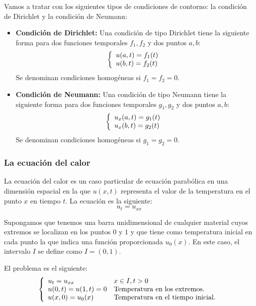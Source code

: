 Vamos a tratar con los siguientes tipos de condiciones de contorno: la condición de Dirichlet y la condición de Neumann:
\begin{itemize}
	\item \textbf{Condición de Dirichlet:}	
	Una condición de tipo Dirichlet tiene la siguiente forma para dos funciones temporales $f_1, f_2$ y dos puntos $a,b$:
	\begin{equation*}
		\left\{
		\begin{array}{l l}
			u(a,t) = f_1(t)\\
			u(b,t) = f_2(t)\\
		\end{array}
		\right.
	\end{equation*}
	Se denominan condiciones homogéneas si $f_1=f_2=0$.
	\item \textbf{Condición de Neumann:}
	Una condición de tipo Neumann tiene la siguiente forma para dos funciones temporales $g_1, g_2$ y dos puntos $a,b$:	
	\begin{equation*}
		\left\{
		\begin{array}{l l}
			u_x(a,t) = g_1(t)\\
			u_x(b,t) = g_2(t)\\
		\end{array}
		\right.
	\end{equation*}
	Se denominan condiciones homogéneas si $g_1=g_2=0$.
\end{itemize}

\subsubsection{La ecuación del calor}
La ecuación del calor es un caso particular de ecuación parabólica en una dimensión espacial en la que $u(x,t)$ representa el valor de la temperatura en el punto $x$ en tiempo $t$. La ecuación es la siguiente:
$$u_t = u_{xx}$$

Supongamos que tenemos una barra unidimensional de cualquier material cuyos extremos se localizan en los puntos $0$ y $1$ y que tiene como temperatura inicial en cada punto la que indica una función proporcionada $u_0(x)$. En este caso, el intervalo $I$ se define como $I = (0,1)$.

El problema es el siguiente:
\begin{equation*}
	\left\{
	\begin{array}{l l l}
		u_t = u_{xx} & x\in I, t>0\\
		u(0,t) = u(1,t) = 0 & \text{Temperatura en los extremos.}\\
		u(x,0) = u_0(x) & \text{Temperatura en el tiempo inicial.}\\
	\end{array}
	\right.
\end{equation*}

